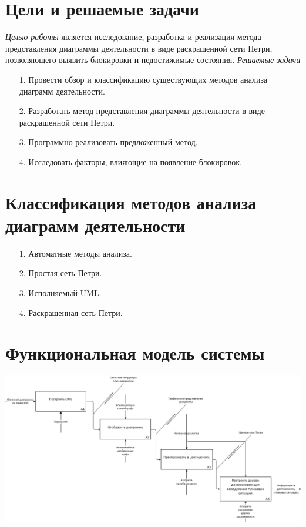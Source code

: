 \documentclass[12pt]{article}
\begin{document}
\TitleSlide

\section{Цели и решаемые задачи}

\emph{Целью работы} является исследование, разработка и реализация метода представления диаграммы деятельности в виде раскрашенной сети Петри, позволяющего выявить блокировки и недостижимые состояния.
 
\emph{Решаемые задачи}

\begin{enumerate}
\item[1.] Провести обзор и классификацию существующих методов анализа диаграмм деятельности.
\item[2.] Разработать метод представления диаграммы деятельности в виде раскрашенной сети Петри.
\item[3.] Программно реализовать предложенный метод.
\item[4.] Исследовать факторы, влияющие на появление блокировок.
\end{enumerate}

\section{Классификация методов анализа диаграмм деятельности}

\begin{enumerate}
\item[1.] Автоматные методы анализа.
\item[2.] Простая сеть Петри.
\item[3.] Исполняемый UML.
\item[4.] Раскрашенная сеть Петри.
\end{enumerate}

\section{Функциональная модель системы}

\begin{center}
\includegraphics[width=\textwidth]{../tex/include/IDEF0.png}
\end{center}
\end{document}
